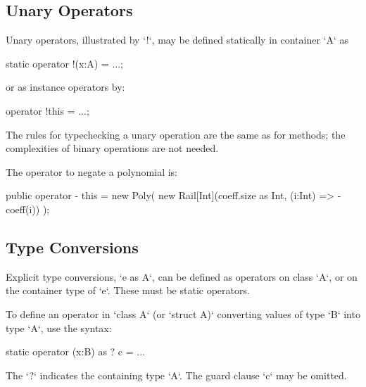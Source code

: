 \subsection{Unary Operators}

Unary operators,  illustrated by \xcd`!`, may be defined statically in
container 
\xcd`A` as 
\begin{xten}
static operator !(x:A) = ...;
\end{xten}
or as instance operators by: 
\begin{xten}
operator !this = ...;
\end{xten}


The rules for typechecking a unary operation are the same as for methods; the
complexities of binary operations are not needed.

\begin{ex}
The operator to negate a polynomial is: 

\begin{xten}
  public operator - this = new Poly(
    new Rail[Int](coeff.size as Int, (i:Int) => -coeff(i))
    );
\end{xten}



\end{ex}


\subsection{Type Conversions}
\label{sect:type-conv}


Explicit type conversions, \xcd`e as A`, can be defined as operators on
class \xcd`A`, or on the container type of \xcd`e`.  These must be static
operators.  

To define an operator in \xcd`class A` (or \xcd`struct A)` converting values
of type \xcd`B` into type \xcd`A`, use the syntax: 
\begin{xten}
static operator (x:B) as ? {c} = ... 
\end{xten}
The \xcd`?` indicates the containing type \xcd`A`.  
The guard clause \xcd`{c}` may be omitted.



